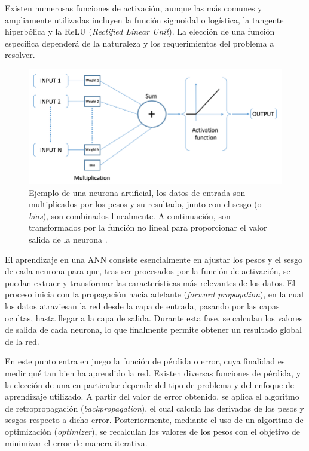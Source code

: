 Existen numerosas funciones de activación, aunque las más comunes y ampliamente utilizadas incluyen la función sigmoidal o logística, la tangente hiperbólica y la ReLU (\textit{Rectified Linear Unit}). La elección de una función específica dependerá de la naturaleza y los requerimientos del problema a resolver.

\begin{figure}[h]
    \centering
    \includegraphics[width=\linewidth]{figures/2_theory/artificialNeuron.png}
    \caption[Ejemplo de una neurona artificial]{Ejemplo de una neurona artificial, los datos de entrada son multiplicados por los pesos y su resultado, junto con el sesgo (o \textit{bias}), son combinados linealmente. A continuación, son transformados por la función no lineal para proporcionar el valor salida de la neurona \cite{artificialNeuron}.}
    \label{fig:artificialNeuronExample}
\end{figure}

El aprendizaje en una ANN consiste esencialmente en ajustar los pesos y el sesgo de cada neurona para que, tras ser procesados por la función de activación, se puedan extraer y transformar las características más relevantes de los datos. El proceso inicia con la propagación hacia adelante (\textit{forward propagation}), en la cual los datos atraviesan la red desde la capa de entrada, pasando por las capas ocultas, hasta llegar a la capa de salida. Durante esta fase, se calculan los valores de salida de cada neurona, lo que finalmente permite obtener un resultado global de la red.

En este punto entra en juego la función de pérdida o error, cuya finalidad es medir qué tan bien ha aprendido la red. Existen diversas funciones de pérdida, y la elección de una en particular depende del tipo de problema y del enfoque de aprendizaje utilizado. A partir del valor de error obtenido, se aplica el algoritmo de retropropagación (\textit{backpropagation}), el cual calcula las derivadas de los pesos y sesgos respecto a dicho error. Posteriormente, mediante el uso de un algoritmo de optimización (\textit{optimizer}), se recalculan los valores de los pesos con el objetivo de minimizar el error de manera iterativa.

